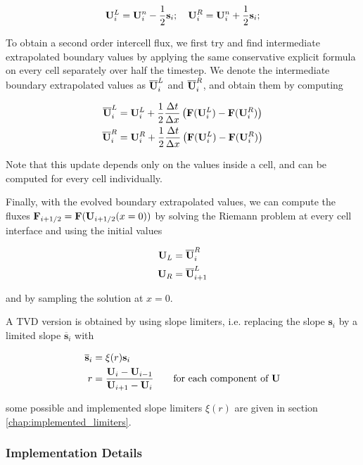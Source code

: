 \begin{equation}
	\mathbf{U}_i^L = \mathbf{U}_i^n - \frac{1}{2} \mathbf{s}_i; \quad 	\mathbf{U}_i^R = \mathbf{U}_i^n + \frac{1}{2} \mathbf{s}_i; 
\end{equation}


To obtain a second order intercell flux, we first try and find intermediate extrapolated boundary values by applying the same conservative explicit formula on every cell separately over half the timestep.
We denote the intermediate boundary extrapolated values as $\overline{\mathbf{U}}_i^L$ and $\overline{\mathbf{U}}_i^R$, and obtain them by computing

\begin{align}
	\overline{\mathbf{U}}_i^L &= \mathbf{U}_i^L + \frac{1}{2} \frac{\Delta t}{\Delta x} \left( \mathbf{F}(\mathbf{U}_i^L) - \mathbf{F}(\mathbf{U}_i^R) \right)\\
	\overline{\mathbf{U}}_i^R &= \mathbf{U}_i^R + \frac{1}{2} \frac{\Delta t}{\Delta x} \left( \mathbf{F}(\mathbf{U}_i^L) - \mathbf{F}(\mathbf{U}_i^R) \right)
\end{align}

Note that this update depends only on the values inside a cell, and can be computed for every cell individually.

Finally, with the evolved boundary extrapolated values, we can compute the fluxes $\mathbf{F}_{i + 1/2} = \mathbf{F}(\mathbf{U}_{i+1/2}(x = 0))$ by solving the Riemann problem at every cell interface and using the initial values

\begin{align}
	\mathbf{U}_L &= \overline{\mathbf{U}}_i^R\\
	\mathbf{U}_R &= \overline{\mathbf{U}}_{i+1}^L 
\end{align}

and by sampling the solution at $x = 0$.


A TVD version is obtained by using slope limiters, i.e. replacing the slope $\mathbf{s}_i$ by a limited slope $\overline{\mathbf{s}}_i$ with

\begin{align*}
	\overline{\mathbf{s}}_i &= \xi(r) \mathbf{s}_i \\
	r &= \frac{\mathbf{U}_i - \mathbf{U}_{i-1}}{\mathbf{U}_{i+1} - \mathbf{U}_{i}} \quad\quad \text{for each component of }\mathbf{U}
\end{align*} 

some possible and implemented slope limiters $\xi(r)$ are given in section \ref{chap:implemented_limiters}.







\subsubsection{Implementation Details}
